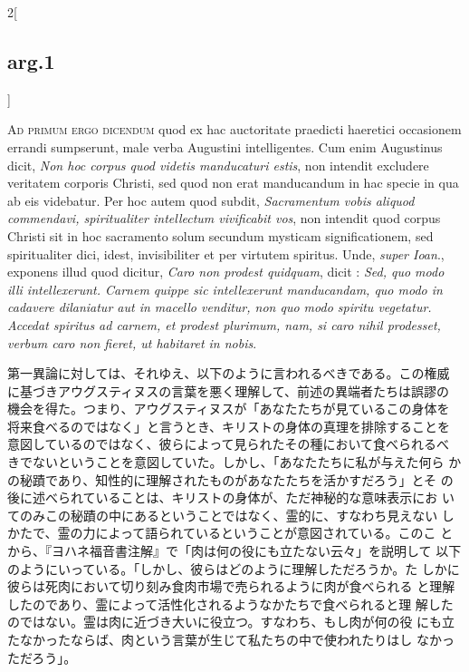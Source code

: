 \documentclass[paper=a4paper,fontsize=10pt,jafontsize=9pt,titlepage]{jlreq}
\begin{document}
\begin{paracol}{2}[\subsection{arg.1}]
\switchcolumn*[\subsection{ad.1}]

{\scshape Ad primum ergo dicendum} quod ex hac auctoritate praedicti
haeretici occasionem errandi sumpserunt, male verba Augustini
intelligentes. Cum enim Augustinus dicit, {\itshape Non hoc corpus
quod videtis manducaturi estis}, non intendit excludere veritatem
corporis Christi, sed quod non erat manducandum in hac specie in qua
ab eis videbatur. Per hoc autem quod subdit, {\itshape Sacramentum
vobis aliquod commendavi, spiritualiter intellectum vivificabit vos},
non intendit quod corpus Christi sit in hoc sacramento solum secundum
mysticam significationem, sed spiritualiter dici, idest, invisibiliter
et per virtutem spiritus. Unde, {\itshape super Ioan}., exponens illud
quod dicitur, {\itshape Caro non prodest quidquam}, dicit : {\itshape
Sed, quo modo illi intellexerunt. Carnem quippe sic intellexerunt
manducandam, quo modo in cadavere dilaniatur aut in macello venditur,
non quo modo spiritu vegetatur. Accedat spiritus ad carnem, et prodest
plurimum, nam, si caro nihil prodesset, verbum caro non fieret, ut
habitaret in nobis}.

\switchcolumn

第一異論に対しては、それゆえ、以下のように言われるべきである。この権威
に基づきアウグスティヌスの言葉を悪く理解して、前述の異端者たちは誤謬の
機会を得た。つまり、アウグスティヌスが「あなたたちが見ているこの身体を
将来食べるのではなく」と言うとき、キリストの身体の真理を排除することを
意図しているのではなく、彼らによって見られたその種において食べられるべ
きでないということを意図していた。しかし、「あなたたちに私が与えた何ら
かの秘蹟であり、知性的に理解されたものがあなたたちを活かすだろう」とそ
の後に述べられていることは、キリストの身体が、ただ神秘的な意味表示にお
いてのみこの秘蹟の中にあるということではなく、霊的に、すなわち見えない
しかたで、霊の力によって語られているということが意図されている。このこ
とから、『ヨハネ福音書注解』で「肉は何の役にも立たない云々」を説明して
以下のようにいっている。「しかし、彼らはどのように理解しただろうか。た
しかに彼らは死肉において切り刻み食肉市場で売られるように肉が食べられる
と理解したのであり、霊によって活性化されるようなかたちで食べられると理
解したのではない。霊は肉に近づき大いに役立つ。すなわち、もし肉が何の役
にも立たなかったならば、肉という言葉が生じて私たちの中で使われたりはし
なかっただろう」。

\switchcolumn*[\subsection{ad.2}]


\end{paracol}
\end{document}
